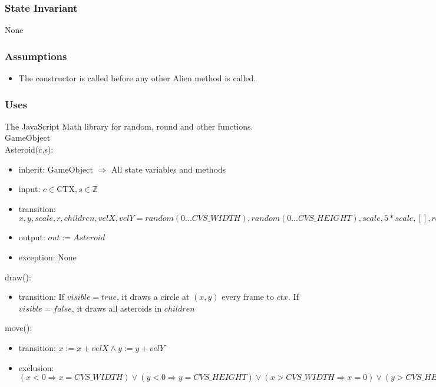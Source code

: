 \documentclass[12pt]{article}
\begin{document}
\subsubsection* {State Invariant}

None

\subsubsection* {Assumptions}

\begin{itemize}
  \item The constructor is called before any other Alien method is called.
\end{itemize}

\subsubsection*{Uses}

The JavaScript Math library for random, round and other functions.\\
GameObject\\

Asteroid(c,s):
\begin{itemize}
    \item inherit: GameObject $\Rightarrow$ All state variables and methods
    \item input: $c \in \mbox{CTX}, s \in \mathbb{Z}$
    \item transition: $ x, y, scale, r, children, velX, velY = random(0...CVS\_WIDTH), random(0...CVS\_HEIGHT), scale, 5*scale, [], random(-1...1) * 3, random(-1...1) * 3$
    \item output: $out := Asteroid$
    \item exception: None
\end{itemize}

\noindent draw():
\begin{itemize}
  \item transition: If $visible = true$, it draws a circle at $(x,y)$ every frame to $ctx$. If $visible = false$, it draws all asteroids in $children$
\end{itemize}

\noindent move():
\begin{itemize}
  \item transition: $x := x + velX \land y := y + velY$
  \item exclusion: $(x < 0 \Rightarrow x = CVS\_WIDTH) \lor (y < 0 \Rightarrow y = CVS\_HEIGHT) \lor (x > CVS\_WIDTH \Rightarrow x = 0) \lor (y > CVS\_HEIGHT \Rightarrow y = 0)$
\end{itemize}
\end{document}
